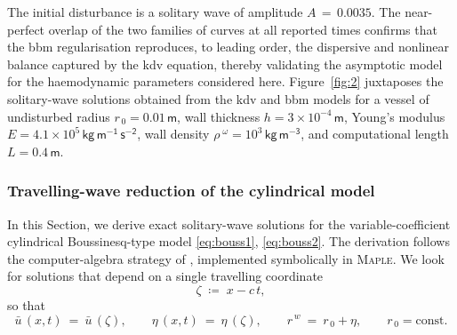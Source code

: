 \documentclass[alpha-refs, 12pt]{wiley-article}
\begin{document}
The initial disturbance is a solitary wave of amplitude $A\,=\,0.0035$. The near-perfect overlap of the two families of curves at all reported times confirms that the \acrshort{bbm} regularisation reproduces, to leading order, the dispersive and nonlinear balance captured by the \acrshort{kdv} equation, thereby validating the asymptotic model for the haemodynamic parameters considered here. Figure~\ref{fig:2} juxtaposes the solitary-wave solutions obtained from the \acrshort{kdv} and \acrshort{bbm} models for a vessel of undisturbed radius $r_{\,0}=0.01\,\mathsf{m}$, wall thickness $h=3\times10^{-4}\,\mathsf{m}$, Young’s modulus $E=4.1\times10^{5}\,\mathsf{kg\,m^{-1}\,s^{-2}}$, wall density $\rho^{\;\omega}=10^{3}\,\mathsf{kg\,m^{-3}}$, and computational length $L=0.4\,\mathsf{m}$.

\subsubsection{Travelling-wave reduction of the cylindrical model}
\label{sec:cyl_travelling_wave}

In this Section, we derive exact solitary-wave solutions for the variable-coefficient cylindrical Boussinesq-type model \eqref{eq:bouss1}, \eqref{eq:bouss2}. The derivation follows the computer-algebra strategy of \cite{Dutykh2007}, implemented symbolically in \textsc{Maple}. We look for solutions that depend on a single travelling coordinate
\begin{equation*}
  \zeta \;\coloneqq\; x - c\,t,
\end{equation*}
so that
\begin{equation*}
  \bar{u}\,(x,t)\ =\ \bar{u}\,(\zeta), \qquad \eta\,(x,t)\ =\ \eta\,(\zeta), \qquad r^{\,w}\ =\ r_{\,0}+\eta, \qquad r_{\,0}=\text{const}.
\end{equation*}
\end{document}
